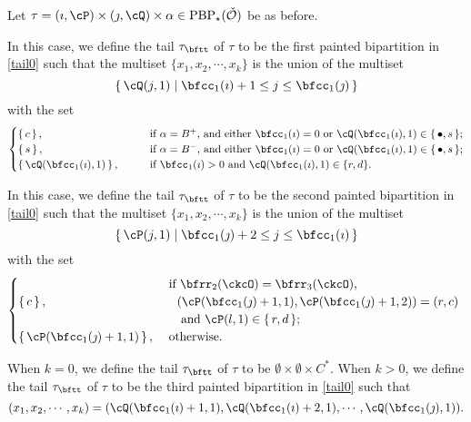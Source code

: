 \documentclass[12pt,a4paper]{amsart}
\newcommand{\CO}{{\mathcal {O}}}
\numberwithin{equation}{section}
\theoremstyle{remark}
\begin{document}
Let
$
\tau=(\imath,\cP)\times(\jmath,\cQ)\times \alpha \in  \mathrm{PBP}_\star(\check \CO)
$ be as before.


In this case, we define the tail $\tau_\bftt$ of $\tau$ to be the first painted bipartition in \eqref{tail0} such that the multiset $\{x_1, x_2, \cdots, x_k\}$ is the
union of the multiset
\[
  \set{\cQ(j,1)| \bfcc_{1}(\imath)+1 \leq j \leq  \bfcc_{1}(\jmath) }
\]
with the set
\[
  \begin{cases}
 \set{c}, &
 \qquad
  \text{if $\alpha = B^+$, and either $\bfcc_{1}(\imath)=0$ or $\cQ(\bfcc_{1}(\imath),1)\in \set{\bullet,s}$};  \\
 \set{s},&
  \qquad \text{if $\alpha = B^-$, and either $\bfcc_{1}(\imath)=0$ or $\cQ(\bfcc_{1}(\imath),1)\in \set{\bullet,s}$}; \\
\set{\cQ(\bfcc_{1}(\imath),1)},&
\qquad  \text{if $\bfcc_{1}(\imath)>0$ and $\cQ(\bfcc_{1}(\imath),1)\in \{r,d\}$.}
\end{cases}
\]


\smallskip

 \smallskip






In this case, we define the tail $\tau_\bftt$ of $\tau$ to be the second painted bipartition in \eqref{tail0} such that the multiset $\{x_1, x_2, \cdots, x_k\}$ is the
union of the multiset
\[
\set{\cP(j,1)| \bfcc_{1}(\jmath)+2 \leq j \leq \bfcc_{1}(\imath)}
\]
with the set
\[
  \begin{cases}
  &
 \ \text{if $\bfrr_2(\ckcO)=\bfrr_3(\ckcO)$,}\\
 \set{c},& \quad \text{$(\cP(\bfcc_{1}(\jmath)+1,1) ,\cP(\bfcc_{1}(\jmath)+1,2)) = (r,c)$ }\\
 & \quad \text{ and $\cP(l,1)\in \set{r,d}$};  \\
\set{\cP(\bfcc_{1}(\jmath)+1,1)},&
\    \text{otherwise.}
\end{cases}
\]

 \smallskip

 \smallskip

When $k=0$, we define the tail $\tau_{\bftt}$ of $\tau$ to be
$\emptyset\times \emptyset \times C^{*}$.
When $k> 0$, we define the tail $\tau_\bftt$ of $\tau$ to be the third painted bipartition in \eqref{tail0} such that
\[
  (x_1, x_2, \cdots, x_k)= (\cQ(\bfcc_{1}(\imath)+1,1),\cQ(\bfcc_{1}(\imath)+2,1),\cdots, \cQ(\bfcc_{1}(\jmath),1)).
\]
\end{document}
